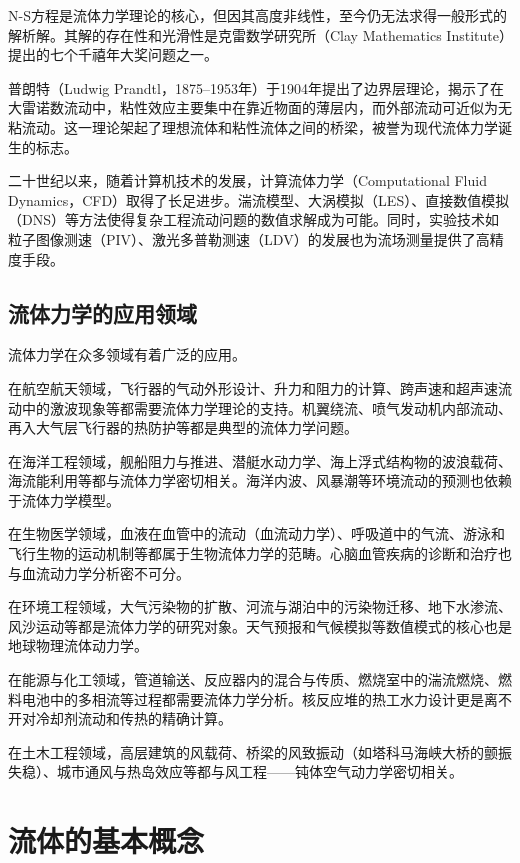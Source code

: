 N-S方程是流体力学理论的核心，但因其高度非线性，至今仍无法求得一般形式的解析解。其解的存在性和光滑性是克雷数学研究所（Clay Mathematics Institute）提出的七个千禧年大奖问题之一。

普朗特（Ludwig Prandtl，1875--1953年）于1904年提出了边界层理论，揭示了在大雷诺数流动中，粘性效应主要集中在靠近物面的薄层内，而外部流动可近似为无粘流动。这一理论架起了理想流体和粘性流体之间的桥梁，被誉为现代流体力学诞生的标志。

二十世纪以来，随着计算机技术的发展，计算流体力学（Computational Fluid Dynamics，CFD）取得了长足进步。湍流模型、大涡模拟（LES）、直接数值模拟（DNS）等方法使得复杂工程流动问题的数值求解成为可能。同时，实验技术如粒子图像测速（PIV）、激光多普勒测速（LDV）的发展也为流场测量提供了高精度手段。

\subsection{流体力学的应用领域}

流体力学在众多领域有着广泛的应用。

在航空航天领域，飞行器的气动外形设计、升力和阻力的计算、跨声速和超声速流动中的激波现象等都需要流体力学理论的支持。机翼绕流、喷气发动机内部流动、再入大气层飞行器的热防护等都是典型的流体力学问题。

在海洋工程领域，舰船阻力与推进、潜艇水动力学、海上浮式结构物的波浪载荷、海流能利用等都与流体力学密切相关。海洋内波、风暴潮等环境流动的预测也依赖于流体力学模型。

在生物医学领域，血液在血管中的流动（血流动力学）、呼吸道中的气流、游泳和飞行生物的运动机制等都属于生物流体力学的范畴。心脑血管疾病的诊断和治疗也与血流动力学分析密不可分。

在环境工程领域，大气污染物的扩散、河流与湖泊中的污染物迁移、地下水渗流、风沙运动等都是流体力学的研究对象。天气预报和气候模拟等数值模式的核心也是地球物理流体动力学。

在能源与化工领域，管道输送、反应器内的混合与传质、燃烧室中的湍流燃烧、燃料电池中的多相流等过程都需要流体力学分析。核反应堆的热工水力设计更是离不开对冷却剂流动和传热的精确计算。

在土木工程领域，高层建筑的风载荷、桥梁的风致振动（如塔科马海峡大桥的颤振失稳）、城市通风与热岛效应等都与风工程——钝体空气动力学密切相关。

\section{流体的基本概念}

